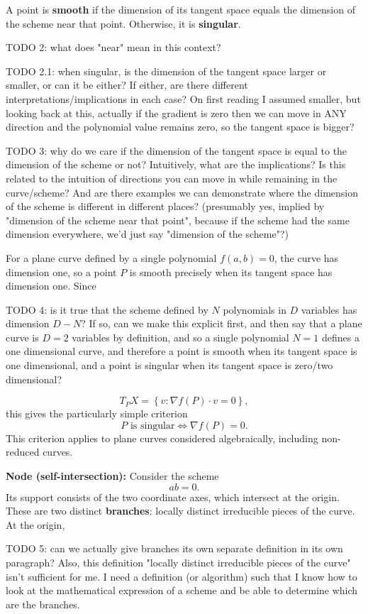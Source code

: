 \documentclass[12pt]{article}
\begin{document}
A point is \textbf{smooth} if the dimension of its tangent space
equals the dimension of the scheme near that point. Otherwise,
it is \textbf{singular}.

TODO 2: what does "near" mean in this context?

TODO 2.1: when singular, is the dimension of the tangent space larger or smaller, or can it be either? If either, are there different interpretations/implications in each case? On first reading I assumed smaller, but looking back at this, actually if the gradient is zero then we can move in ANY direction and the polynomial value remains zero, so the tangent space is bigger?

TODO 3: why do we care if the dimension of the tangent space is equal to the dimension of the scheme or not? Intuitively, what are the implications? Is this related to the intuition of directions you can move in while remaining in the curve/scheme? And are there examples we can demonstrate where the dimension of the scheme is different in different places? (presumably yes, implied by "dimension of the scheme near that point", because if the scheme had the same dimension everywhere, we'd just say "dimension of the scheme"?)

For a plane curve defined by a single polynomial $f(a,b)=0$,
the curve has dimension one, so a point $P$ is smooth precisely
when its tangent space has dimension one. Since

TODO 4: is it true that the scheme defined by $N$ polynomials in $D$ variables has dimension $D-N$? If so, can we make this explicit first, and then say that a plane curve is $D=2$ variables by definition, and so a single polynomial $N=1$ defines a one dimensional curve, and therefore a point is smooth when its tangent space is one dimensional, and a point is singular when its tangent space is zero/two dimensional?

\[
T_PX=\left\{v:\nabla f(P)\cdot v=0\right\},
\]
this gives the particularly simple criterion
\[
\boxed{P\text{ is singular}\iff\nabla f(P)=0.}
\]
This criterion applies to plane curves considered algebraically,
including non-reduced curves.

\textbf{Node (self-intersection):} Consider the scheme
\[
ab=0.
\]
Its support consists of the two coordinate axes, which intersect
at the origin. These are two distinct \textbf{branches}: locally
distinct irreducible pieces of the curve. At the origin,

TODO 5: can we actually give branches its own separate definition in its own paragraph? Also, this definition "locally distinct irreducible pieces of the curve" isn't sufficient for me. I need a definition (or algorithm) such that I know how to look at the mathematical expression of a scheme and be able to determine which are the branches.
\end{document}
